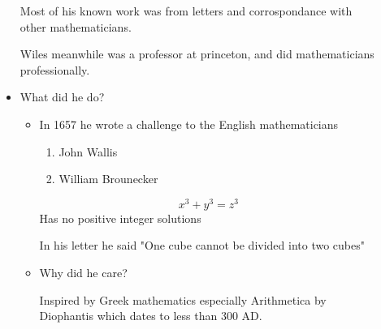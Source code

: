 \documentclass{report}
\begin{document}
\begin{description}
\begin{itemize}
\begin{mdframed}
                    Most of his known work was from letters and
                    corrospondance with other mathematicians.
                \end{mdframed}
                \begin{mdframed}
                    Wiles meanwhile was a professor at princeton,
                    and did mathematicians professionally.
                \end{mdframed}
            \item What did he do?
                \begin{itemize}
                    \item In 1657 he wrote a challenge to the
                        English mathematicians
                        \begin{enumerate}
                            \item John Wallis
                            \item William Brounecker
                        \end{enumerate}
                        \begin{mdframed}
                            \begin{displaymath}
                            x^3 + y^3 = z^3
                            \end{displaymath}
                            Has no positive integer
                            solutions
                        \end{mdframed}
                        \begin{mdframed}
                            In his letter he said
                            "One cube cannot be divided into two
                            cubes"
                        \end{mdframed}
                        \pagebreak
                    \item Why did he care?
                        \begin{mdframed}
                            Inspired by Greek mathematics
                            especially Arithmetica by
                            Diophantis which dates to
                            less than 300 AD.


\end{mdframed}
\end{itemize}
\end{itemize}
\end{description}
\end{document}
